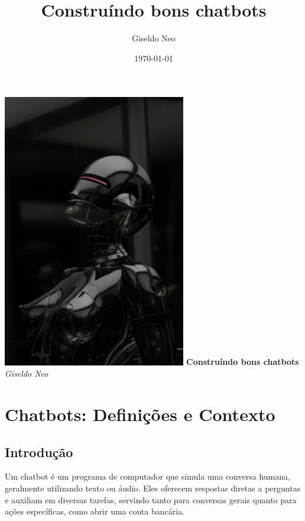 \documentclass[a4paper,oneside]{book}
\title{Construíndo bons chatbots}
\author{Giseldo Neo}
\date{\today}
\begin{document}
\begin{titlepage}
	\begin{center}
		\vspace*{2cm}
		\includegraphics[width=0.6\textwidth]{fig/capa.png}
		\vfill
		\Huge \textbf{Construíndo bons chatbots} \\
		\vspace{1cm}
		\Large \textit{Giseldo Neo} \\
	\end{center}
\end{titlepage}



\tableofcontents
\newpage

\chapter{Chatbots: Definições e Contexto}

\section{Introdução}

Um chatbot é um programa de computador que simula uma conversa humana, geralmente utilizando texto ou áudio. Eles oferecem respostas diretas a perguntas e auxiliam em diversas tarefas, servindo tanto para conversas gerais quanto para ações específicas, como abrir uma conta bancária.
\end{document}
